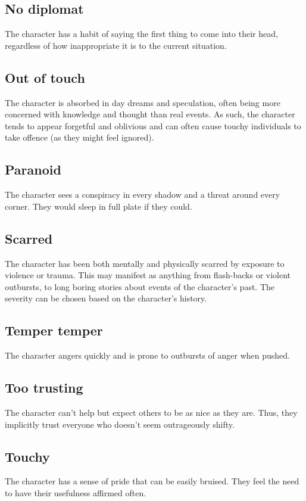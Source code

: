 \documentclass[a4paper,10pt,oneside]{book}
\begin{document}
\subsection{No diplomat}
The character has a habit of saying the first thing to come into their head, regardless of how inappropriate it is to the current situation.

\subsection{Out of touch}
The character is absorbed in day dreams and speculation, often being more concerned with knowledge and thought than real events. As such, the character tends to appear forgetful and oblivious and can often cause touchy individuals to take offence (as they might feel ignored).

\subsection{Paranoid}
The character sees a conspiracy in every shadow and a threat around every corner. They would sleep in full plate if they could.

\subsection{Scarred}
The character has been both mentally and physically scarred by exposure to violence or trauma. This may manifest as anything from flash-backs or violent outbursts, to long boring stories about events of the character's past. The severity can be chosen based on the character's history.

\subsection{Temper temper}
The character angers quickly and is prone to outbursts of anger when pushed.

\subsection{Too trusting} 
The character can't help but expect others to be as nice as they are. Thus, they implicitly trust everyone who doesn't seem outrageously shifty.

\subsection{Touchy}
The character has a sense of pride that can be easily bruised. They feel the need to have their usefulness affirmed often.
\end{document}
